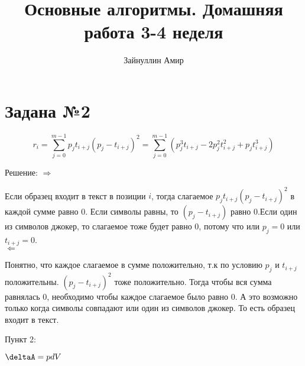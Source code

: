 \documentclass{article}
\begin{document}
\title{\textbf{Основные алгоритмы. Домашняя работа 3-4 неделя}}
\author{Зайнуллин Амир}
\maketitle

\section*{Задана №2}
$$r_i =  \sum_{j=0}^{m-1} p_{j} t_{i+j}\left(p_{j}-t_{i+j}\right)^{2} = \sum_{j=0}^{m-1}\left(p_{j}^{3} t_{i+j}-2 p_{j}^{2} t_{i+j}^{2}+p_{j} t_{i+j}^{3}\right) $$


Решение: 
$\Rightarrow$

Если образец входит в текст в позиции $i$, тогда слагаемое $p_{j} t_{i+j}\left(p_{j}-t_{i+j}\right)^{2}$ в каждой сумме равно 0.
Если символы равны, то $\left(p_{j}-t_{i+j}\right)$ равно 0.Если один из символов джокер, то слагаемое тоже будет равно 0, потому что или $p_{j} = 0$ или $t_{i + j} = 0$. \\

$\Leftarrow$

Понятно, что каждое слагаемое в сумме положительно, т.к по условию $p_{j}$ и $t_{i+j}$ положительны. $\left(p_{j}-t_{i+j}\right)^{2}$ тоже положительно. 
Тогда чтобы вся сумма равнялась 0, необходимо чтобы каждое слагаемое было равно 0. А это возможно только когда символы совпадают или один из символов джокер. То есть образец входит в текст. 

Пункт 2:



$ \deltaA = p dV$
\end{document}
